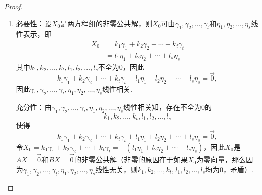 \begin{proof}
\begin{enumerate}
        \item 必要性：设$X_0$是两方程组的非零公共解，则$X_0$可由$\gamma_1,\gamma_2,\ldots,\gamma_t$和$\eta_1,\eta_2,\ldots,\eta_s$线性表示，即
              \begin{align*}
                  X_0 & =k_1\gamma_1+k_2\gamma_2+\cdots+k_t\gamma_t \\
                      & =l_1\eta_1+l_2\eta_2+\cdots+l_s\eta_s
              \end{align*}
              其中$k_1,k_2,\ldots,k_t,l_1,l_2,\ldots,l_s$不全为0，因此
              \[k_1\gamma_1+k_2\gamma_2+\cdots+k_t\gamma_t-l_1\eta_1-l_2\eta_2-\cdots-l_s\eta_s=\vec{0},\]
              因此$\gamma_1,\gamma_2,\ldots,\gamma_t,\eta_1,\eta_2,\ldots,\eta_s$线性相关.

              充分性：由$\gamma_1,\gamma_2,\ldots,\gamma_t,\eta_1,\eta_2,\ldots,\eta_s$线性相关知，存在不全为0的
              \[k_1,k_2,\ldots,k_t,l_1,l_2,\ldots,l_s\]
              使得
              \[k_1\gamma_1+k_2\gamma_2+\cdots+k_t\gamma_t+l_1\eta_1+l_2\eta_2+\cdots+l_s\eta_s=\vec{0},\]
              令$X_0=k_1\gamma_1+k_2\gamma_2+\cdots+k_t\gamma_t=-(l_1\eta_1+l_2\eta_2+\cdots+l_s\eta_s)$，因此$X_0$是$AX=\vec{0}$和$BX=\vec{0}$的非零公共解（非零的原因在于如果$X_0$为零向量，那么因为$\gamma_1,\gamma_2,\ldots,\gamma_t,\eta_1,\eta_2,\ldots,\eta_s$线性无关，则$k_1,k_2,\ldots,k_t,l_1,l_2,\ldots,l_s$均为0，矛盾）.
    \end{enumerate}
\end{proof}

